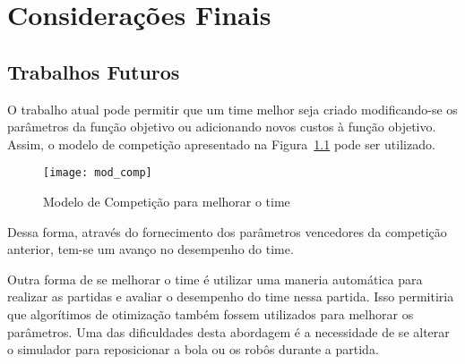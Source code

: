 \chapter{Considerações Finais}\label{cap:cons_finais}

\section{Trabalhos Futuros}

O trabalho atual pode permitir que um time melhor
seja criado modificando-se os parâmetros da função
objetivo ou adicionando novos custos à função objetivo.
Assim, o modelo de competição apresentado na
Figura~\ref{fig:mod_comp} pode ser utilizado.

\begin{figure}[H]
  \centering
  \texttt{[image: mod\_comp]}
  \caption{Modelo de Competição para melhorar
           o time}\label{fig:mod_comp}
\end{figure}

Dessa forma, através do fornecimento dos parâmetros
vencedores da competição anterior, tem-se um avanço
no desempenho do time.

Outra forma de se melhorar o time é utilizar uma
maneria automática para realizar as partidas e
avaliar o desempenho do time nessa partida. Isso
permitiria que algorítimos de otimização também
fossem utilizados para melhorar os parâmetros.
Uma das dificuldades desta abordagem é a necessidade
de se alterar o simulador para reposicionar a bola
ou os robôs durante a partida.
 
%



